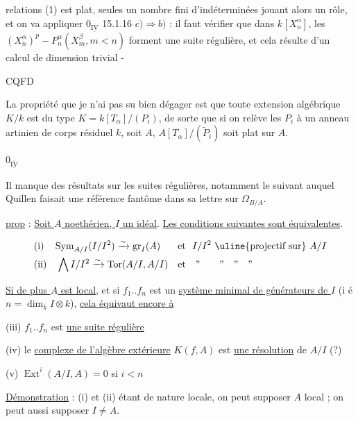 

relations (1) est plat, seules un nombre fini d'indéterminées jouant alors un rôle, et on va appliquer $0_{\overline{\underline{\mathrm{IV}}}}$ 15.1.16 $c)\Rightarrow b)$ : il faut vérifier que dans $k[X_n^\alpha]$, les $(X_n^\alpha)^p-P_n^\alpha(X_m^\beta,m<n)$ forment une suite régulière, et cela résulte d'un calcul de dimension trivial -

\hfill CQFD

La propriété que je n'ai pas su bien dégager est que toute extension algébrique $K/k$ est du type $K=k[T_\alpha]/(P_i)$, de sorte que si on relève les $P_i$ à un anneau artinien de corps résiduel $k$, soit $A$, $A[T_\alpha]/(\widetilde P_i)$ soit plat sur $A$.

$0_{\overline{\underline{\mathrm{IV}}}}$\quad{}

Il manque des résultats sur les suites régulières, notamment le suivant auquel Quillen faisait une référence fantôme dans sa lettre sur $\Omega_{B/A}$.


\uline{prop} : \uline{Soit $A$ noethérien, $I$ un idéal}. \uline{Les conditions suivantes sont équivalentes}.

\[
\begin{aligned}
&\text{(i)}\quad\operatorname{Sym}_{A/I}(I/I^2)\xrightarrow{\sim}\operatorname{gr}_I(A)
&&\text{et }\ I/I^2\ \text{\uline{projectif sur} } A/I\\
&\text{(ii)}\quad \bigwedge I/I^2\xrightarrow{\sim}\operatorname{Tor}(A/I,A/I)
&&\text{et}\quad\text{''}\qquad\text{''}\quad\text{''}\quad\text{''}
\end{aligned}
\]

\uline{Si de plus $A$ est local}, et si $f_1..f_n$ est un \uline{système minimal de générateurs de $I$} (i é $n=\dim_k I\otimes k$), \uline{cela équivaut encore à}


(iii) $f_1..f_n$ est \uline{une suite régulière}

(iv) le \uline{complexe de l'algèbre extérieure} $K(f,A)$ est \uline{une résolution} de $A/I$ (?)

(v) $\operatorname{Ext}^i(A/I,A)=0$ si $i<n$

\uline{Démonstration} : (i) et (ii) étant de nature locale, on peut supposer $A$ local ; on peut aussi supposer $I\ne A$.

